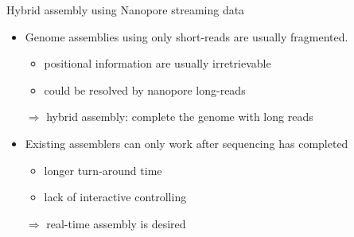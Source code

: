 \documentclass{beamer}
\begin{document}
{
\begin{frame}[plain]
\end{frame}
}
%
\begin{frame}{Hybrid assembly using Nanopore streaming data}
\begin{itemize}
\item Genome assemblies using only short-reads are usually fragmented.
  \begin{itemize}
  \item positional information are usually irretrievable
  \item could be resolved by nanopore long-reads 
  \end{itemize} 
\item[$\Rightarrow$] hybrid assembly: complete the genome with long reads
\item Existing assemblers can only work after sequencing has completed
  \begin{itemize}
  \item longer turn-around time
  \item	lack of interactive controlling
  \end{itemize} 
\item[$\Rightarrow$] real-time assembly is desired
\end{itemize}
\end{frame}
\end{document}
